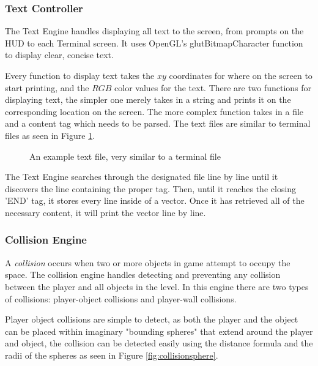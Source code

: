 \documentclass{article}
\begin{document}
\subsubsection{Text Controller} \label{subsubsec:textcontroller}

The Text Engine handles displaying all text to the screen, from prompts on the HUD to each Terminal screen. It uses OpenGL's glutBitmapCharacter function to display clear, concise text.

Every function to display text takes the $xy$ coordinates for where on the screen to start printing, and the $RGB$ color values for the text. There are two functions for displaying text, the simpler one merely takes in a string and prints it on the corresponding location on the screen. The more complex function takes in a file and a content tag which needs to be parsed. The text files are similar to terminal files as seen in Figure \ref{fig:text}.

\begin{figure}[H]

\caption{An example text file, very similar to a terminal file}
\label{fig:text}
\end{figure}

The Text Engine searches through the designated file line by line until it discovers the line containing the proper tag. Then, until it reaches the closing 'END' tag, it stores every line inside of a vector. Once it has retrieved all of the necessary content, it will print the vector line by line.

\subsubsection{Collision Engine} \label{subsubsec:collision}

A \emph{collision} occurs when two or more objects in game attempt to occupy the space. The collision engine handles detecting and preventing any collision between the player and all objects in the level. In this engine there are two types of collisions: player-object collisions and player-wall collisions.

Player object collisions are simple to detect, as both the player and the object can be placed within imaginary "bounding spheres" that extend around the player and object, the collision can be detected easily using the distance formula and the radii of the spheres as seen in Figure \ref{fig:collisionsphere}.
\end{document}
